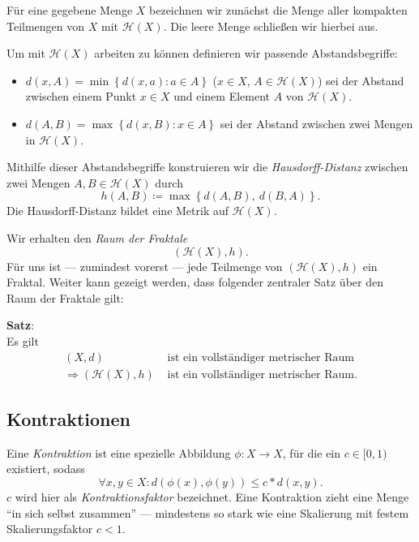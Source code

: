 \documentclass[afourpaper]{tufte-handout}
\begin{document}
Für eine gegebene Menge \( X \) bezeichnen wir zunächst die Menge aller kompakten Teilmengen von \( X \) mit \( \mathcal{H}(X) \). Die leere Menge schließen wir hierbei aus.

Um mit \( \mathcal{H}(X) \) arbeiten zu können definieren wir passende Abstandsbegriffe:
\begin{itemize}
  \item \( d(x,A) = \min\left \{ d(x,a) : a \in A \right \} \) (\( x \in X \), \( A \in \mathcal{H}(X) \)) sei der Abstand zwischen einem Punkt \( x \in X \) und einem Element \( A \) von \( \mathcal{H}(X) \).
  \item \( d(A,B) = \max\left \{ d(x,B) : x \in A \right \} \) sei der Abstand zwischen zwei Mengen in \( \mathcal{H}(X) \).
\end{itemize}

Mithilfe dieser Abstandsbegriffe konstruieren wir die \emph{Hausdorff-Distanz} zwischen zwei Mengen \( A,B \in \mathcal{H}(X) \) durch
\begin{equation*}
  h(A,B) \coloneqq \max\left \{ d(A,B),\ d(B,A) \right \}\text{.}
\end{equation*}
Die Hausdorff-Distanz bildet eine Metrik auf \( \mathcal{H}(X) \).

Wir erhalten den \emph{Raum der Fraktale}
\begin{equation*}
  (\mathcal{H}(X), h)\text{.}
\end{equation*}
Für uns ist --- zumindest vorerst --- jede Teilmenge von \( (\mathcal{H}(X), h) \) ein Fraktal. Weiter kann gezeigt werden, dass folgender zentraler Satz über den Raum der Fraktale gilt:

\begin{theorembox}
  \textbf{Satz}:  \\
  \vspace{1mm}
  Es gilt
  \begin{align*}
    (X,d) &\text{ ist ein vollständiger metrischer Raum} \\
    \Rightarrow (\mathcal{H}(X), h) &\text{ ist ein vollständiger metrischer Raum.}
  \end{align*}
\end{theorembox}

\subsection{Kontraktionen}

Eine \emph{Kontraktion} ist eine spezielle Abbildung \( \phi: X \to X \), für die ein \( c \in [0,1) \) existiert, sodass
\begin{equation*}
  \forall x,y \in X : d(\phi(x), \phi(y)) \bm{\leq} c * d(x,y)\text{.}
\end{equation*}
\( c \) wird hier als \emph{Kontraktionsfaktor} bezeichnet.
Eine Kontraktion zieht eine Menge ``in sich selbst zusammen'' --- mindestens so stark wie eine Skalierung mit festem Skalierungsfaktor \( c < 1 \).
\end{document}
